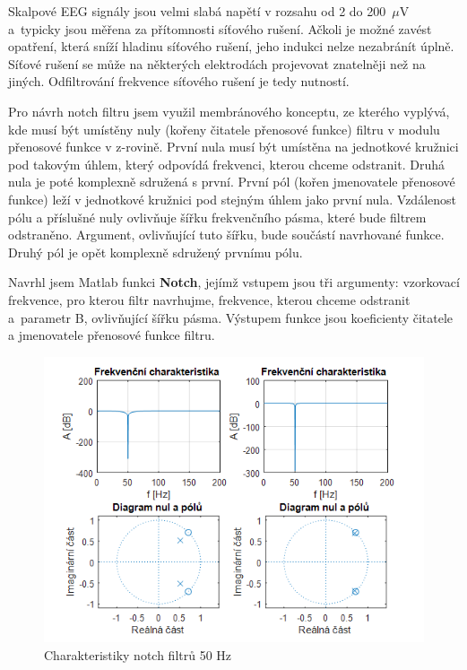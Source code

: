 Skalpové EEG signály jsou velmi slabá napětí v rozsahu od 2 do 200~$\mu$V a~typicky jsou měřena za přítomnosti síťového rušení. Ačkoli je možné zavést opatření, která sníží hladinu síťového rušení, jeho indukci nelze nezabránít úplně. Síťové rušení se může na některých elektrodách projevovat znatelněji než na jiných. Odfiltrování frekvence síťového rušení je tedy nutností. \cite{63}

Pro návrh notch filtru jsem využil membránového konceptu, ze kterého vyplývá, kde musí být umístěny nuly (kořeny čitatele přenosové funkce) filtru v modulu přenosové funkce v z-rovině. První nula musí být umístěna na jednotkové kružnici pod takovým úhlem, který odpovídá frekvenci, kterou chceme odstranit. Druhá nula je poté komplexně sdružená s první. První pól (kořen jmenovatele přenosové funkce) leží v jednotkové kružnici pod stejným úhlem jako první nula. Vzdálenost pólu a příslušné nuly ovlivňuje šířku frekvenčního pásma, které bude filtrem odstraněno. Argument, ovlivňující tuto šířku, bude součástí navrhované funkce. Druhý pól je opět komplexně sdružený prvnímu pólu. \cite{64}

Navrhl jsem Matlab funkci \textbf{Notch}, jejímž vstupem jsou tři argumenty: vzorkovací frekvence, pro kterou filtr navrhujme, frekvence, kterou chceme odstranit a~parametr B, ovlivňující šířku pásma. Výstupem funkce jsou koeficienty čitatele a jmenovatele přenosové funkce filtru.
\begin{figure}[!h]
\includegraphics[width=1.0\textwidth]{casti/implementace/notch/charakteristika.png}
\caption{Charakteristiky notch filtrů 50 Hz}
\end{figure}

